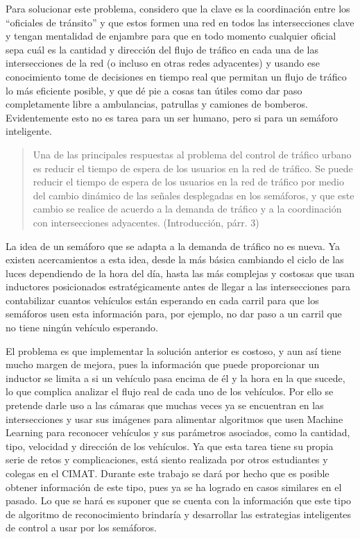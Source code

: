 Para solucionar este problema, considero que la clave es la coordinación
entre los ``oficiales de tránsito'' y que estos formen una red en todos
las intersecciones clave y tengan mentalidad de enjambre para que en
todo momento cualquier oficial sepa cuál es la cantidad y dirección del
flujo de tráfico en cada una de las intersecciones de la red (o incluso
en otras redes adyacentes) y usando ese conocimiento tome de decisiones
en tiempo real que permitan un flujo de tráfico lo más eficiente
posible, y que dé pie a cosas tan útiles como dar paso completamente
libre a ambulancias, patrullas y camiones de bomberos. Evidentemente
esto no es tarea para un ser humano, pero si para un semáforo
inteligente.

\begin{quote}
Una de las principales respuestas al problema del control de tráfico
urbano es reducir el tiempo de espera de los usuarios en la red de
tráfico. Se puede reducir el tiempo de espera de los usuarios en la red
de tráfico por medio del cambio dinámico de las señales desplegadas en
los semáforos, y que este cambio se realice de acuerdo a la demanda de
tráfico y a la coordinación con intersecciones adyacentes.
(Introducción, párr. 3)
\end{quote}

La idea de un semáforo que se adapta a la demanda de tráfico no es
nueva. Ya existen acercamientos a esta idea, desde la más básica
cambiando el ciclo de las luces dependiendo de la hora del día, hasta
las más complejas y costosas que usan inductores posicionados
estratégicamente antes de llegar a las intersecciones para contabilizar
cuantos vehículos están esperando en cada carril para que los semáforos
usen esta información para, por ejemplo, no dar paso a un carril que no
tiene ningún vehículo esperando.

El problema es que implementar la solución anterior es costoso, y aun
así tiene mucho margen de mejora, pues la información que puede
proporcionar un inductor se limita a si un vehículo pasa encima de él y
la hora en la que sucede, lo que complica analizar el flujo real de cada
uno de los vehículos. Por ello se pretende darle uso a las cámaras que
muchas veces ya se encuentran en las intersecciones y usar sus imágenes
para alimentar algoritmos que usen Machine Learning para reconocer
vehículos y sus parámetros asociados, como la cantidad, tipo, velocidad
y dirección de los vehículos. Ya que esta tarea tiene su propia serie de
retos y complicaciones, está siento realizada por otros estudiantes y
colegas en el CIMAT. Durante este trabajo se dará por hecho que es
posible obtener información de este tipo, pues ya se ha logrado en casos
similares en el pasado. Lo que se hará es suponer que se cuenta con la
información que este tipo de algoritmo de reconocimiento brindaría y
desarrollar las estrategias inteligentes de control a usar por los
semáforos.

